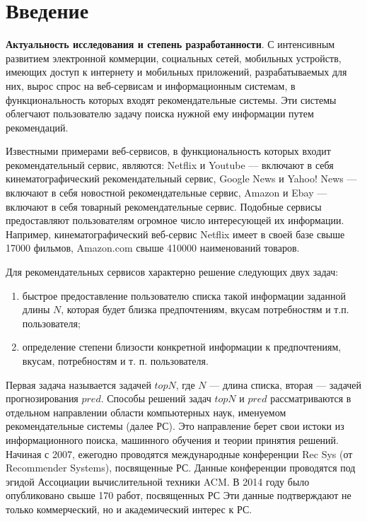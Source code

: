 \chapter*{Введение}
{\bf Актуальность исследования и степень разработанности}.
С интенсивным развитием электронной коммерции, социальных сетей,
мобильных устройств, имеющих доступ к интернету и мобильных приложений,
разрабатываемых для них, вырос спрос на веб-сервисам
и информационным системам, в функциональность которых
входят рекомендательные системы.
Эти системы облегчают
пользователю задачу
поиска нужной ему информации путем рекомендаций.

Известными примерами веб-сервисов, в функциональность которых входит
рекомендательный сервис, являются: Netflix \cite{Netflix}
и Youtube \cite{youtube} ---
включают в себя кинематографический рекомендательный сервис,
Google News и Yahoo! News ---
включают в себя новостной рекомендательные сервис,
Amazon и Ebay ---
включают в себя товарный рекомендательные сервис.
Подобные сервисы
предоставляют пользователям огромное число интересующей их информации.
Например, кинематографический веб-сервис Netflix имеет в своей базе свыше
17000 фильмов, Amazon.com свыше 410000 наименований товаров.

Для рекомендательных сервисов характерно решение следующих двух задач:
\begin{enumerate}[label*=\arabic*)]
	\item быстрое предоставление пользователю списка такой информации заданной длины $N$,
		которая будет близка предпочтениям, вкусам потребностям и т.п.
		пользователя;

	\item определение степени близости конкретной информации к предпочтениям,
		вкусам, потребностям и т. п. пользователя.
\end{enumerate}

Первая задача называется задачей $topN$, где $N$ --- длина списка,
вторая --- задачей прогнозирования $pred$.
Способы решений задач $topN$ и $pred$
рассматриваются в отдельном направлении области компьютерных
наук, именуемом рекомендательные системы (далее РС). Это направление
берет свои истоки из информационного поиска, машинного обучения и теории
принятия решений. Начиная с 2007, ежегодно проводятся международные конференции
Rec Sys (от Recommender Systems), посвященные РС. Данные конференции
проводятся под эгидой Ассоциации вычислительной техники ACM.
В 2014 году было опубликовано свыше 170 работ, посвященных РС \cite{number-of-researches-2014}
Эти данные подтверждают не только коммерческий, но и академический интерес к
РС.


